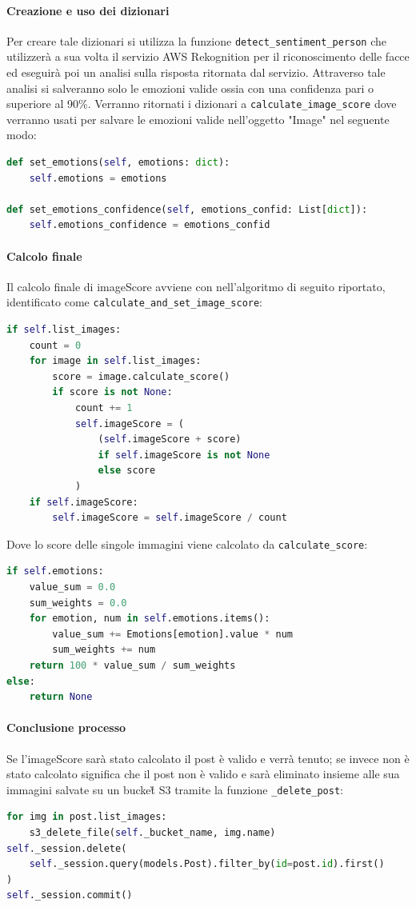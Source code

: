 \paragraph{Creazione e uso dei dizionari} \aCapo{}
Per creare tale dizionari si utilizza la funzione \verb+detect_sentiment_person+ che utilizzerà a sua volta il servizio AWS Rekognition per il riconoscimento delle facce ed eseguirà poi un analisi sulla risposta ritornata dal servizio. Attraverso tale analisi si salveranno solo le emozioni valide ossia con una confidenza pari o superiore al 90\%. Verranno ritornati i dizionari a \verb+calculate_image_score+ dove verranno usati per salvare le emozioni valide nell'oggetto "Image" nel seguente modo:
\begin{lstlisting}[language=Python]
def set_emotions(self, emotions: dict):
    self.emotions = emotions

def set_emotions_confidence(self, emotions_confid: List[dict]):
    self.emotions_confidence = emotions_confid
\end{lstlisting}
\paragraph{Calcolo finale} \aCapo{}
Il calcolo finale di imageScore avviene con nell'algoritmo di seguito riportato, identificato come \verb+calculate_and_set_image_score+: 
\begin{lstlisting}[language=Python]
if self.list_images:
    count = 0
    for image in self.list_images:
        score = image.calculate_score()
        if score is not None:
            count += 1
            self.imageScore = (
                (self.imageScore + score)
                if self.imageScore is not None
                else score
            )
    if self.imageScore:
        self.imageScore = self.imageScore / count
\end{lstlisting}
Dove lo score delle singole immagini viene calcolato da \verb+calculate_score+:
\begin{lstlisting}[language=Python]
if self.emotions:
    value_sum = 0.0
    sum_weights = 0.0
    for emotion, num in self.emotions.items():
        value_sum += Emotions[emotion].value * num
        sum_weights += num
    return 100 * value_sum / sum_weights
else:
    return None
\end{lstlisting}
\paragraph{Conclusione processo} \aCapo{}
Se l'imageScore sarà stato calcolato il post è valido e verrà tenuto; se invece non è stato calcolato significa che il post non è valido e sarà eliminato insieme alle sua immagini salvate su un bucket\G{} S3 tramite la funzione \verb+_delete_post+:
\begin{lstlisting}[language=Python]
for img in post.list_images:
    s3_delete_file(self._bucket_name, img.name)
self._session.delete(
    self._session.query(models.Post).filter_by(id=post.id).first()
)
self._session.commit()
\end{lstlisting}
